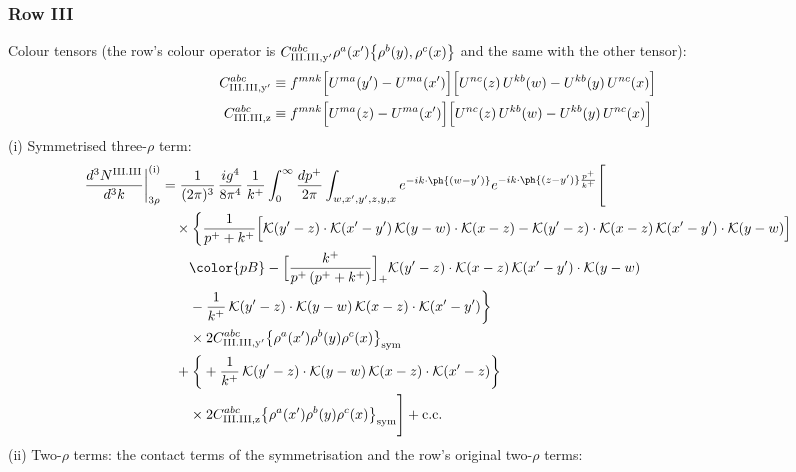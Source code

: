 \subsubsection*{Row III}
Colour tensors (the row's colour operator is $C^{abc}_{{\rm III.III,y'}}\rho^{a}(x')\big\{\rho^{b}(y),\rho^{c}(x)\big\}$ and the same with the other tensor):
\begin{align}
C^{abc}_{{\rm III.III,y'}}&\equiv f^{mnk}\Big[U^{ma}(y')-U^{ma}(x')\Big]\Big[U^{nc}(z)\,U^{kb}(w)-U^{kb}(y)\,U^{nc}(x)\Big]\notag\\
C^{abc}_{{\rm III.III,z}}&\equiv f^{mnk}\Big[U^{ma}(z)-U^{ma}(x')\Big]\Big[U^{nc}(z)\,U^{kb}(w)-U^{kb}(y)\,U^{nc}(x)\Big]\notag
\end{align}
(i) Symmetrised three-$\rho$ term:
\begin{align}
\frac{d^{3}N^{\rm III.III}}{d^{3}k}\bigg|^{\rm (i)}_{3\rho}&=\frac{1}{(2\pi)^{3}}\,\frac{ig^{4}}{8\pi^{4}}\,\frac{1}{k^{+}}\int_{0}^{\infty}\frac{dp^{+}}{2\pi}\int_{w,x',y',z,y,x}e^{-ik\cdot\ph{(w-y')}}e^{-ik\cdot\ph{(z-y')}\frac{p^{+}}{k^{+}}}\Bigg[\notag\\
&\quad\times\bigg\{\frac{1}{p^{+}+k^{+}}\Big[\mathcal{K}(y'-z)\cdot\mathcal{K}(x'-y')\,\mathcal{K}(y-w)\cdot\mathcal{K}(x-z)-\mathcal{K}(y'-z)\cdot\mathcal{K}(x-z)\,\mathcal{K}(x'-y')\cdot\mathcal{K}(y-w)\Big]\notag\\
&\qquad{\color{pB}-\Big[\frac{k^{+}}{p^{+}\,(p^{+}+k^{+})}\Big]_{+}\mathcal{K}(y'-z)\cdot\mathcal{K}(x-z)\,\mathcal{K}(x'-y')\cdot\mathcal{K}(y-w)}\notag\\
&\qquad-\frac{1}{k^{+}}\,\mathcal{K}(y'-z)\cdot\mathcal{K}(y-w)\,\mathcal{K}(x-z)\cdot\mathcal{K}(x'-y')\bigg\}\notag\\
&\qquad\times 2C^{abc}_{{\rm III.III,y'}}\big\{\rho^{a}(x')\rho^{b}(y)\rho^{c}(x)\big\}_{\rm sym}\notag\\
&\quad+\bigg\{+\frac{1}{k^{+}}\,\mathcal{K}(y'-z)\cdot\mathcal{K}(y-w)\,\mathcal{K}(x-z)\cdot\mathcal{K}(x'-z)\bigg\}\notag\\
&\qquad\times 2C^{abc}_{{\rm III.III,z}}\big\{\rho^{a}(x')\rho^{b}(y)\rho^{c}(x)\big\}_{\rm sym}\Bigg]+{\rm c.c.}\label{eq:D-III.III-3}
\end{align}
(ii) Two-$\rho$ terms: the contact terms of the symmetrisation and the row's original two-$\rho$ terms:
